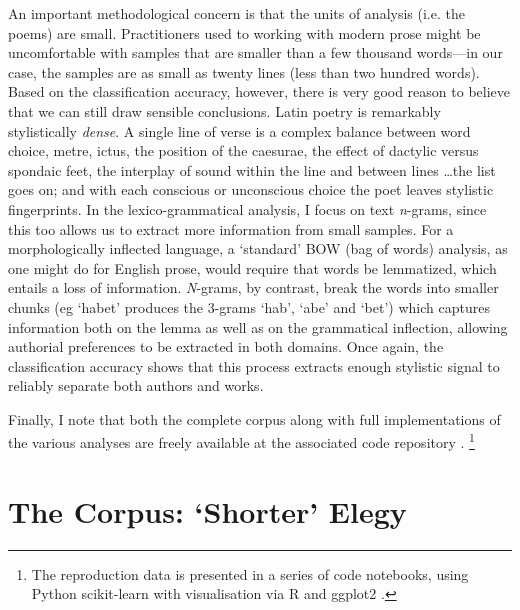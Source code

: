 \documentclass[twocolumn, switch, a4paper]{article} %
\begin{document}
An important methodological concern is that the units of analysis (i.e. the
poems) are small. Practitioners used to working with modern prose might be
uncomfortable with samples that are smaller than a few thousand words---in our
case, the samples are as small as twenty lines (less than two hundred words).
Based on the classification accuracy, however, there is very good reason to
believe that we can still draw sensible conclusions. Latin poetry is
remarkably stylistically \emph{dense}. A single line of verse is a complex
balance between word choice, metre, ictus, the position of the caesurae, the
effect of dactylic versus spondaic feet, the interplay of sound within the
line and between lines \dots the list goes on; and with each conscious or
unconscious choice the poet leaves stylistic fingerprints. In the
lexico-grammatical analysis, I focus on text \emph{n}-grams, since this too
allows us to extract more information from small samples. For a
morphologically inflected language, a `standard' BOW (bag of words) analysis,
as one might do for English prose, would require that words be lemmatized,
which entails a loss of information. \emph{N}-grams, by contrast, break the
words into smaller chunks (eg `habet' produces the 3-grams `hab', `abe' and
`bet') which captures information both on the lemma as well as on the
grammatical inflection, allowing authorial preferences to be extracted in both
domains. Once again, the classification accuracy shows that this process
extracts enough stylistic signal to reliably separate both authors and works.

Finally, I note that both the complete corpus along with full implementations
of the various analyses are freely available at the associated code repository
\cite{nagy_heroides_2022}.%
%
    \footnote{The reproduction data is presented in a series of code
    notebooks, using Python scikit-learn \cite{scikit-learn} with
    visualisation via R and ggplot2 \cite{ggplot}.}
%
\section{The Corpus: `Shorter' Elegy}
\end{document}
